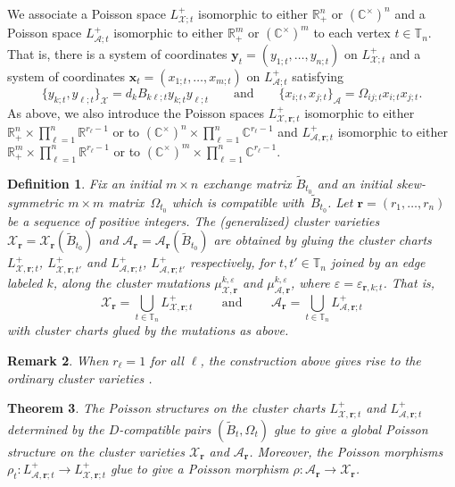 \documentclass{amsart}
\newtheorem{theorem}{Theorem}[section]
\newtheorem{definition}[theorem]{Definition}
\newtheorem{remark}[theorem]{Remark}
\numberwithin{equation}{section}
\newcommand{\bfr}{{\boldsymbol{r}}}
\newcommand{\bfx}{{\boldsymbol{x}}}
\newcommand{\bfy}{{\boldsymbol{y}}}
\newcommand{\cA}{\mathcal{A}}
\newcommand{\cX}{\mathcal{X}}
\newcommand{\CC}{\mathbb{C}}
\newcommand{\RR}{\mathbb{R}}
\newcommand{\TT}{\mathbb{T}}
\begin{document}
We associate a Poisson space $L^+_{\cX;t}$ isomorphic to either $\RR_+^n$ or $(\CC^\times)^n$ and a Poisson space $L^+_{\cA;t}$ isomorphic to either $\RR_+^m$ or $(\CC^\times)^m$ to each vertex $t\in\TT_n$.
That is, there is a system of coordinates $\bfy_t=(y_{1;t},\ldots,y_{n;t})$ on $L^+_{\cX;t}$ and a system of coordinates $\bfx_t=(x_{1;t},\ldots,x_{m;t})$ on $L^+_{\cA;t}$ satisfying
\begin{equation}
  \label{eq:brackets3}
  \{y_{k;t},y_{\ell;t}\}_\cX=d_kB_{k\ell;t}y_{k;t}y_{\ell;t}\qquad\text{and}\qquad\{x_{i;t},x_{j;t}\}_\cA=\Omega_{ij;t}x_{i;t}x_{j;t}.
\end{equation}
As above, we also introduce the Poisson spaces $L^+_{\cX,\bfr;t}$ isomorphic to either $\RR_+^n\times\prod_{\ell=1}^n \RR^{r_\ell-1}$ or to $(\CC^\times)^n\times\prod_{\ell=1}^n \CC^{r_\ell-1}$ and $L^+_{\cA,\bfr;t}$ isomorphic to either $\RR_+^m\times\prod_{\ell=1}^n \RR^{r_\ell-1}$ or to $(\CC^\times)^m\times\prod_{\ell=1}^n \CC^{r_\ell-1}$.

\begin{definition}
  Fix an initial $m\times n$ exchange matrix $\tilde B_{t_0}$ and an initial skew-symmetric $m\times m$ matrix~$\Omega_{t_0}$ which is compatible with~$\tilde B_{t_0}$.
  Let $\bfr=(r_1,\ldots,r_n)$ be a sequence of positive integers.
  The \emph{(generalized) cluster varieties} $\cX_\bfr=\cX_\bfr(\tilde B_{t_0})$ and $\cA_\bfr=\cA_\bfr(\tilde B_{t_0})$ are obtained by gluing the cluster charts $L^+_{\cX,\bfr;t}$, $L^+_{\cX,\bfr;t'}$ and $L^+_{\cA,\bfr;t}$, $L^+_{\cA,\bfr;t'}$ respectively, for $t,t'\in\TT_n$ joined by an edge labeled $k$, along the cluster mutations $\mu_{\cX,\bfr}^{k,\varepsilon}$ and $\mu_{\cA,\bfr}^{k,\varepsilon}$, where $\varepsilon=\varepsilon_{\bfr,k;t}$.
  That is, 
  \begin{equation}
    \label{eq:cluster varieties}
    \cX_\bfr=\bigcup_{t\in\TT_n} L^+_{\cX,\bfr;t}\qquad\text{ and }\qquad\cA_\bfr=\bigcup_{t\in\TT_n} L^+_{\cA,\bfr;t}
  \end{equation}
  with cluster charts glued by the mutations as above.
\end{definition}
\begin{remark}
  When $r_\ell=1$ for all $\ell$, the construction above gives rise to the ordinary cluster varieties \cite{FZ01,FG09a}.
\end{remark}

\begin{theorem}
  \cite{GSV10}
  The Poisson structures on the cluster charts $L^+_{\cX,\bfr;t}$ and $L^+_{\cA,\bfr;t}$ determined by the $D$-compatible pairs $(\tilde B_t,\Omega_t)$ glue to give a global Poisson structure on the cluster varieties $\cX_\bfr$ and $\cA_\bfr$.
  Moreover, the Poisson morphisms $\rho_t:L^+_{\cA,\bfr;t}\to L^+_{\cX,\bfr;t}$ glue to give a Poisson morphism $\rho:\cA_\bfr\to\cX_\bfr$.
\end{theorem}
\end{document}
